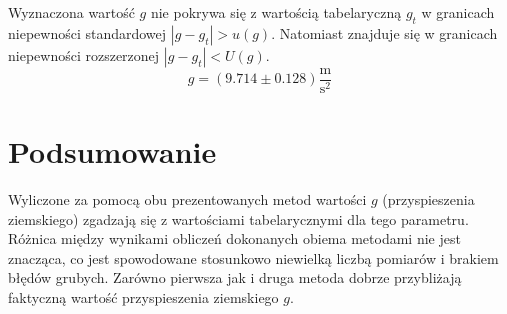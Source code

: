 \documentclass{fizraport}
\begin{document}
Wyznaczona wartość $g$ nie pokrywa się z wartością tabelaryczną $g_t$ w granicach niepewności standardowej $|g-g_t|>u(g)$. Natomiast znajduje się w granicach niepewności rozszerzonej $|g-g_t|<U(g)$.
\[ g=(9.714\pm0.128)\frac{\text{m}}{\text{s}^2}\] %
\section{Podsumowanie}
Wyliczone za pomocą obu prezentowanych metod wartości $g$ (przyspieszenia ziemskiego) zgadzają się z wartościami tabelarycznymi dla tego parametru. Różnica między wynikami obliczeń dokonanych obiema metodami nie jest znacząca, co jest spowodowane stosunkowo niewielką liczbą pomiarów i brakiem błędów grubych.
Zarówno pierwsza jak i druga metoda dobrze przybliżają faktyczną wartość przyspieszenia ziemskiego $g$.
\end{document}
